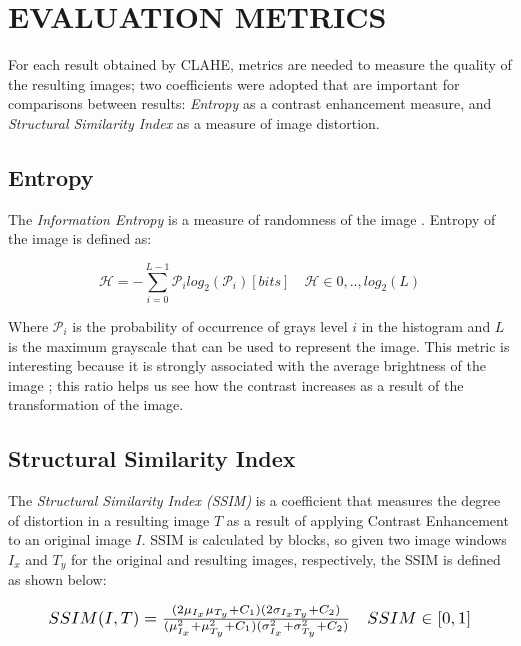 \documentclass[spanish,twocolumn]{article}
\begin{document}
\section{EVALUATION METRICS}
\label{sec:metricas}

For each result obtained by CLAHE, metrics are needed to measure the quality of the resulting images; two coefficients were adopted that are important for comparisons between results:  {\it Entropy} as a contrast enhancement measure, and {\it Structural Similarity Index} as a measure of image distortion.  

\subsection{Entropy}
\label{ssec:entropia}

The {\it Information Entropy} is a measure of randomness of the image \cite{tsai2008information}. Entropy of the image is defined as:

\begin{equation}\label{eq:entropia}
\mathscr{H}=-\sum_{i=0}^{L-1}\mathcal{P}_i log_2(\mathcal{P}_i) [bits] \quad \mathscr{H} \in {0,..,log_2(L)} 
\end{equation}

Where $\mathcal{P}_i$ is the probability of occurrence of grays level $i$ in the histogram and $L$ is the maximum grayscale that can be used to represent the image. This metric is interesting because it is strongly associated with the average brightness of the image \cite{108593}; this ratio helps us see how the contrast increases as a result of the transformation of the image.

\subsection{Structural Similarity Index}
\label{ssec:ssim}

The {\it Structural Similarity Index (SSIM)} \cite{wang2004image} is a coefficient that measures the degree of distortion in a resulting image $T$ as a result of applying Contrast Enhancement to an original image $I$. SSIM is calculated by blocks, so given two image windows $I_x$ and $T_y$ for the original and resulting images, respectively, the SSIM is defined as shown below:

\begin{equation}\label{eq:ssim}
\resizebox{.9\hsize}{!}
{
$SSIM(I,T)=\frac{(2\mu_{I_x}\mu_{T_y}+C_1)(2\sigma_{I_xT_y}+C_2)}{(\mu_{I_x}^2+\mu_{T_y}^2+C_1)(\sigma_{I_x}^2+\sigma_{T_y}^2+C_2)} \quad SSIM \in [0,1]$
}
\end{equation}
\end{document}

